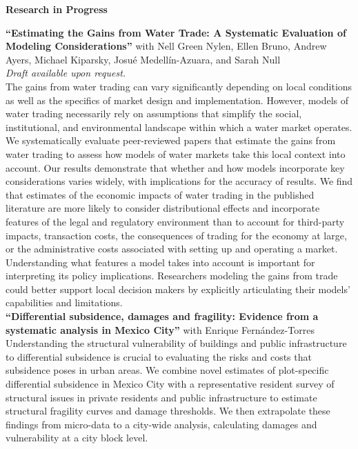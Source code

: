 \documentclass[10pt, oneside]{article}
\begin{document}
\begin{minipage}[t]{0.1\linewidth}
\textbf{Research in Progress}
\end{minipage}\hspace{0.05\linewidth}
\begin{minipage}[t]{0.8\linewidth}
\textbf{``Estimating the Gains from Water Trade: A Systematic
Evaluation of Modeling Considerations''} with Nell Green Nylen, Ellen Bruno, Andrew Ayers, Michael Kiparsky, Josué Medellín-Azuara, and Sarah Null \\ 
\emph{Draft available upon request.} \\

The gains from water trading can vary significantly depending on local conditions as well as the specifics of market design and implementation. However, models of water trading necessarily rely on assumptions that simplify the social, institutional, and environmental landscape within which a water market operates. We systematically evaluate peer-reviewed papers that estimate the gains from water trading to assess how models of water markets  take this local context into account. Our results demonstrate that whether and how models incorporate key considerations varies widely, with implications for the accuracy of results. We find that estimates of the economic impacts of water trading in the published literature are more likely to consider distributional effects and incorporate features of the legal and regulatory environment than to account for third-party impacts, transaction costs, the consequences of trading for the economy at large, or the administrative costs associated with setting up and operating a market. Understanding what features a model takes into account is important for interpreting its policy implications. Researchers modeling the gains from trade could better support local decision makers by explicitly articulating their models’ capabilities and limitations.\\ 

\textbf{``Differential subsidence, damages and fragility: Evidence from a systematic analysis in Mexico City''} with Enrique Fernández-Torres\\ 

Understanding the structural vulnerability of buildings and public infrastructure to differential subsidence is crucial to evaluating the risks and costs that subsidence poses in urban areas. We combine novel estimates of plot-specific differential subsidence in Mexico City with a representative resident survey of structural issues in private residents and public infrastructure to estimate structural fragility curves and damage thresholds. We then extrapolate these findings from micro-data to a city-wide analysis, calculating damages and vulnerability at a city block level. \\ 
\end{minipage}
\end{document}
